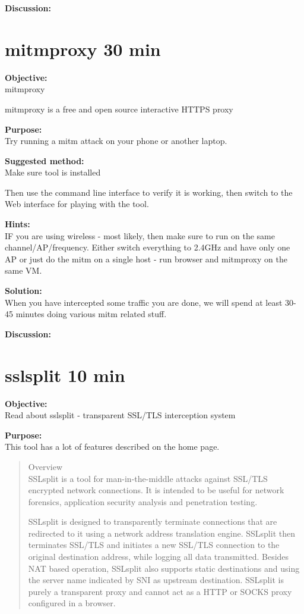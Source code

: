 \documentclass[a4paper,11pt,notitlepage]{report}
\begin{document}
{\bf Discussion:}\\



\chapter{mitmproxy 30 min}
\label{ex:mitmproxy}

{\bf Objective:}\\
mitmproxy 

mitmproxy is a free and open source interactive HTTPS proxy

{\bf Purpose:}\\
Try running a mitm attack on your phone or another laptop.

{\bf Suggested method:}\\
Make sure tool is installed

Then use the command line interface to verify it is working, then switch to the Web interface for playing with the tool.

{\bf Hints:}\\
IF you are using wireless - most likely, then make sure to run on the same channel/AP/frequency. Either switch everything to 2.4GHz and have only one AP or just do the mitm on a single host - run browser and mitmproxy on the same VM.

{\bf Solution:}\\
When you have intercepted some traffic you are done, we will spend at least 30-45 minutes doing various mitm related stuff.

{\bf Discussion:}\\

\chapter{sslsplit 10 min}
\label{ex:sslsplit}

{\bf Objective:}\\
Read about sslsplit 
- transparent SSL/TLS interception system

{\bf Purpose:}\\
This tool has a lot of features described on the home page.

\begin{quote}\small
Overview\\
SSLsplit is a tool for man-in-the-middle attacks against SSL/TLS encrypted network connections. It is intended to be useful for network forensics, application security analysis and penetration testing.

SSLsplit is designed to transparently terminate connections that are redirected to it using a network address translation engine. SSLsplit then terminates SSL/TLS and initiates a new SSL/TLS connection to the original destination address, while logging all data transmitted. Besides NAT based operation, SSLsplit also supports static destinations and using the server name indicated by SNI as upstream destination. SSLsplit is purely a transparent proxy and cannot act as a HTTP or SOCKS proxy configured in a browser.
\end{quote}
\end{document}
